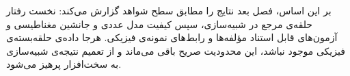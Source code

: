 بر این اساس، فصل بعد نتایج را مطابق سطح شواهد گزارش می‌کند: نخست رفتار حلقه‌ی مرجع در شبیه‌سازی، سپس کیفیت مدل عددی و جانشین مغناطیسی و آزمون‌های قابل استناد مؤلفه‌ها و رابط‌های نمونه‌ی فیزیکی. هرجا داده‌ی حلقه‌بسته‌ی فیزیکی موجود نباشد، این محدودیت صریح باقی می‌ماند و از تعمیم نتیجه‌ی شبیه‌سازی به سخت‌افزار پرهیز می‌شود.
